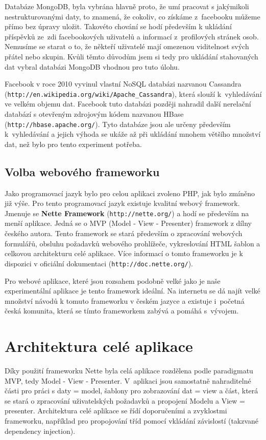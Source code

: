\documentclass[thesis=M,czech]{FITthesis}[2013/05/10]
\begin{document}
Databáze MongoDB, byla vybrána hlavně proto, že umí pracovat s jakýmikoli nestrukturovanými daty, to znamená, že cokoliv, co získáme z~facebooku můžeme přímo bez úpravy uložit. Takovéto chování se hodí především k ukládání příspěvků ze~zdi facebookových uživatelů a informací z~profilových stránek osob. Nemusíme se starat o to, že někteří uživatelé mají omezenou viditelnost svých přátel nebo skupin. Kvůli těmto důvodům jsem si tedy pro ukládání stahovaných dat vybral databázi MongoDB vhodnou pro tuto úlohu.

Facebook v roce 2010 vyvinul vlastní NoSQL databázi nazvanou Cassandra (\verb|http://en.wikipedia.org/wiki/Apache_Cassandra|), která  slouží \newline k~vyhledávání ve velkém objemu dat. Facebook tuto databázi později nahradil další nerelační databází  s otevřeným zdrojovým kódem nazvanou HBase (\verb|http://hbase.apache.org/|). Tyto databáze jsou ale určeny především k~vyhledávání a jejich výhoda se ukáže až při ukládání mnohem většího množství dat, než bylo pro tento experiment potřeba.

\subsection{Volba webového frameworku}

Jako programovací jazyk bylo pro celou aplikaci zvoleno PHP, jak bylo zmíněno již výše. Pro tento programovací jazyk existuje kvalitní webový framework. Jmenuje se \textbf{Nette Framework} (\verb|http://nette.org/|) a hodí se především na menší aplikace. Jedná se o MVP (Model - View - Presenter) framework z dílny českého autora. Tento framework se stará především o zpracování webových formulářů, obsluhu požadavků webového prohlížeče, vykreslování HTML šablon a celkovou architekturu celé aplikace. Více informací o tomto frameworku je k dispozici v oficiální dokumentaci (\verb|http://doc.nette.org/|). 

Pro webové aplikace, které jsou rozsahem podobně velké jako je naše experimentální aplikace je tento framework ideální. Na internetu se dá najít velké množství návodů k tomuto frameworku v českém jazyce a existuje i~početná česká komunita, která se tímto frameworkem zabývá a pomáhá s~vývojem. 


\section{Architektura celé aplikace}

Díky použití frameworku Nette byla celá aplikace rozdělena podle paradigmatu MVP, tedy Model - View - Presenter. V~aplikaci jsou samostatně nahraditelné části pro práci s daty = model, šablony pro zobrazování dat = view a část, která se stará o zpracování uživatelských požadavků a propojení Modelu a View = presenter. Architektura celé aplikace se řídí doporučeními a zvyklostmi frameworku, například pro propojování tříd pomocí vkládání závislostí (takzvané dependency injection).
\end{document}
